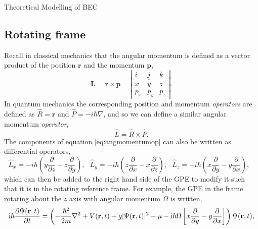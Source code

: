 \begin{chapter}{\label{cha:theoretical_model}Theoretical Modelling of BEC}
	\subsection{\label{section:rotatingframe} Rotating frame}
	Recall in classical mechanics that the angular momentum is defined as a vector product of the position $\mathbf{r}$ and the momentum $\mathbf{p}$,
	\begin{equation*}
		\mathbf{L} = \mathbf{r} \times \mathbf{p} = 
		\left| \begin{array}{ccc}
\underline{i} & \underline{j} & \underline{k} \\
x & y & z \\
p_x & p_y & p_z \end{array} \right|.
	\end{equation*}
	In quantum mechanics the corresponding position and momentum {\it operators} are defined as $\hat{R} = \mathbf{r}$ and $\hat{P} = -i\hbar\nabla$, and so we can define a similar angular momentum {\it operator},
	\begin{equation}\label{eq:angmomentumop}
		\hat{L} = \hat{R} \times \hat{P}.
	\end{equation}
	The components of equation \ref{eq:angmomentumop} can also be written as differential operators,
	\begin{equation}
		\hat{L}_x = -i\hbar\left ( y \frac{\partial}{\partial z} - z \frac{\partial}{\partial y} \right ),~~~
		\hat{L}_y = -i\hbar\left ( z \frac{\partial}{\partial x} - x \frac{\partial}{\partial z} \right ),~~~
		\hat{L}_z = -i\hbar\left ( x \frac{\partial}{\partial y} - y \frac{\partial}{\partial x} \right ),~~~
	\end{equation}
 which can then be added to the right hand side of the GPE to modify it such that it is in the rotating reference frame. For example, the GPE in the frame rotating about the $z$ axis with angular momentum $\Omega$ is written,
	\begin{equation}\label{eq:rotframegpe}
	\mathrm{i}\hbar \frac{\partial\Psi({\bf r},t)}{\partial t} = \left(-\frac{\hbar^2}{2m}\nabla^2 + V({\bf r},t) + g|\Psi({\bf r},t)|^2 - \mu -\mathrm{i}\hbar\Omega\left [ x \frac{\partial}{\partial y} - y \frac{\partial}{\partial x} \right ] \right ) \Psi({\bf r},t),
	\end{equation}


\end{chapter}
